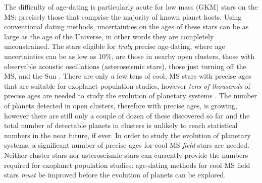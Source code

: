 
The difficulty of age-dating is particularly acute for low mass (GKM) stars on
the MS: precisely those that comprise the majority of known planet hosts.
Using conventional dating methods, uncertainties on the ages of these stars
can be as large as the age of the Universe, in other words they are completely
unconstrained.
The stars eligible for {\it truly} precise age-dating, where age uncertainties
can be as low as 10\%, are those in nearby open clusters, those with
observable acoustic oscillations (asteroseismic stars), those just turning off
the MS, and the Sun
\citep[see][for a review of stellar ages]{soderblom2010}.
There are only a few tens of cool, MS stars with precise ages that are
suitable for exoplanet population studies, however {\it tens-of-thousands} of
precise ages are needed to study the evolution of planetary systems
\citep[\eg][]{petigura2013, foreman-mackey2014, veras2015, burke2015}.
The number of planets detected in open clusters, therefore with precise ages,
is growing, however there are still only a couple of dozen of these discovered
so far and the total number of detectable planets in clusters is unlikely to
reach statistical numbers in the near future, if ever.
In order to study the evolution of planetary systems, a significant number of
precise ages for cool MS {\it field} stars are needed.
Neither cluster stars nor asteroseismic stars can currently provide the
numbers required for exoplanet population studies: age-dating methods for cool
MS field stars {\it must} be improved before the evolution of planets can be
explored.


